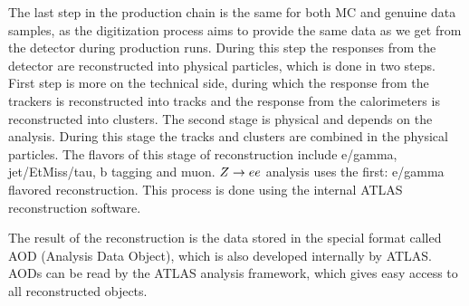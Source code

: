 The last step in the production chain is the same for both MC and genuine data samples, as the digitization process aims to provide the same data as we get from the detector during production runs. During this step the responses from the detector are reconstructed into physical particles, which is done in two steps. First step is more on the technical side, during which the response from the trackers is reconstructed into tracks and the response from the calorimeters is reconstructed into clusters. The second stage is physical and depends on the analysis. During this stage the tracks and clusters are combined in the physical particles. The flavors of this stage of reconstruction include e/gamma, jet/EtMiss/tau, b tagging and muon. $Z \rightarrow ee$ analysis uses the first: e/gamma flavored reconstruction. This process is done using the internal ATLAS reconstruction software.

The result of the reconstruction is the data stored in the special format called AOD (Analysis Data Object), which is also developed internally by ATLAS. AODs can be read by the ATLAS analysis framework, which gives easy access to all reconstructed objects.

\begin{figure}[htb]
\end{figure}

